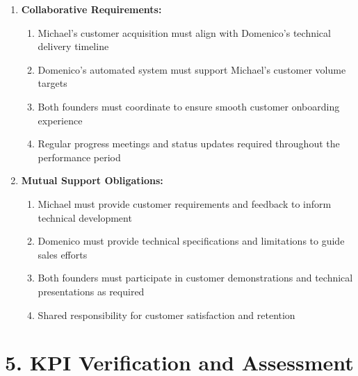 \begin{enumerate}[label=\arabic*.]
\item \textbf{Collaborative Requirements:}
    \begin{enumerate}[label=(\alph*)]
    \item Michael's customer acquisition must align with Domenico's technical delivery timeline
    \item Domenico's automated system must support Michael's customer volume targets
    \item Both founders must coordinate to ensure smooth customer onboarding experience
    \item Regular progress meetings and status updates required throughout the performance period
    \end{enumerate}

\item \textbf{Mutual Support Obligations:}
    \begin{enumerate}[label=(\alph*)]
    \item Michael must provide customer requirements and feedback to inform technical development
    \item Domenico must provide technical specifications and limitations to guide sales efforts
    \item Both founders must participate in customer demonstrations and technical presentations as required
    \item Shared responsibility for customer satisfaction and retention
    \end{enumerate}
\end{enumerate}

\section*{5. KPI Verification and Assessment}

